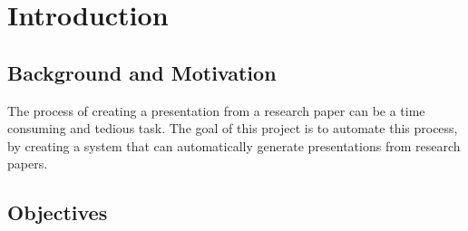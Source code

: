 
\chapter{Introduction}
\label{ch:intro}


\section{Background and Motivation}
\label{sec:intro:background}


The process of creating a presentation from a research paper can be a time consuming and tedious task. The goal of this project is to automate this process, by creating a system that can automatically generate presentations from research papers.


\section{Objectives}
\label{sec:intro:objectives}


